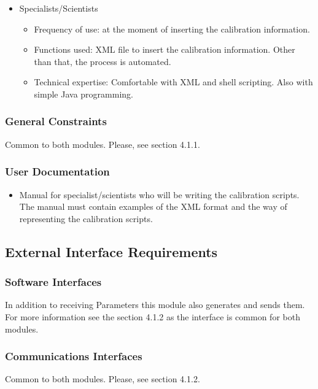 \begin{itemize}
\item Specialists/Scientists
\begin{itemize}
\item Frequency of use: at the moment of inserting the calibration information.
\item Functions used: XML file to insert the calibration information. Other than that, the process is automated.
\item Technical expertise: Comfortable with XML and shell scripting. Also with simple Java programming.
\end{itemize}
\end{itemize}


\subsubsection{General Constraints}

Common to both modules. Please, see section 4.1.1.

\subsubsection{User Documentation}
\begin{itemize}
\item Manual for specialist/scientists who will be writing the calibration scripts. The manual must contain examples of the XML format and the way of representing the calibration scripts.
\end{itemize}

\subsection{External Interface Requirements}

\subsubsection{Software Interfaces}

In addition to receiving Parameters this module also generates and sends them. For more information see the section 4.1.2 as the interface is common for both modules.


\subsubsection{Communications Interfaces}

Common to both modules. Please, see section 4.1.2.

